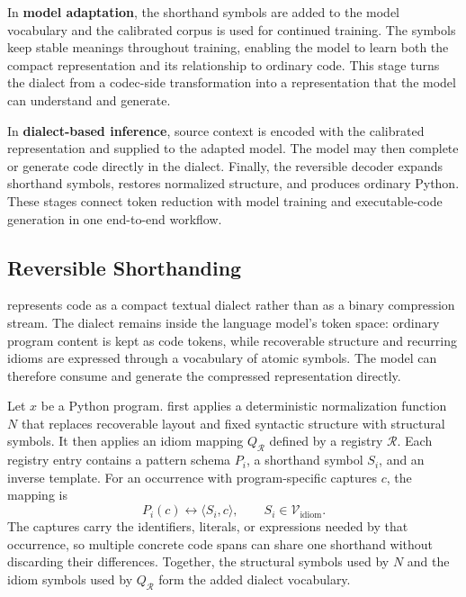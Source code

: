 In \textbf{model adaptation}, the shorthand symbols are added to the model vocabulary and the calibrated corpus is used for continued training. The symbols keep stable meanings throughout training, enabling the model to learn both the compact representation and its relationship to ordinary code. This stage turns the dialect from a codec-side transformation into a representation that the model can understand and generate.

In \textbf{dialect-based inference}, source context is encoded with the calibrated \tool representation and supplied to the adapted model. The model may then complete or generate code directly in the dialect. Finally, the reversible decoder expands shorthand symbols, restores normalized structure, and produces ordinary Python. These stages connect token reduction with model training and executable-code generation in one end-to-end workflow.



\subsection{Reversible Shorthanding}
\label{subsec:reversible_mapping}

\tool represents code as a compact textual dialect rather than as a binary compression stream. The dialect remains inside the language model's token space: ordinary program content is kept as code tokens, while recoverable structure and recurring idioms are expressed through a vocabulary of atomic symbols. The model can therefore consume and generate the compressed representation directly.

Let $x$ be a Python program. \tool first applies a deterministic normalization function $N$ that replaces recoverable layout and fixed syntactic structure with structural symbols. It then applies an idiom mapping $Q_{\mathcal{R}}$ defined by a registry $\mathcal{R}$. Each registry entry contains a pattern schema $P_i$, a shorthand symbol $S_i$, and an inverse template. For an occurrence with program-specific captures $c$, the mapping is
\begin{equation}
    P_i(c) \longleftrightarrow \langle S_i, c \rangle,
    \qquad S_i \in \mathcal{V}_{\mathrm{idiom}}.
\end{equation}
The captures carry the identifiers, literals, or expressions needed by that occurrence, so multiple concrete code spans can share one shorthand without discarding their differences. Together, the structural symbols used by $N$ and the idiom symbols used by $Q_{\mathcal{R}}$ form the added dialect vocabulary.

